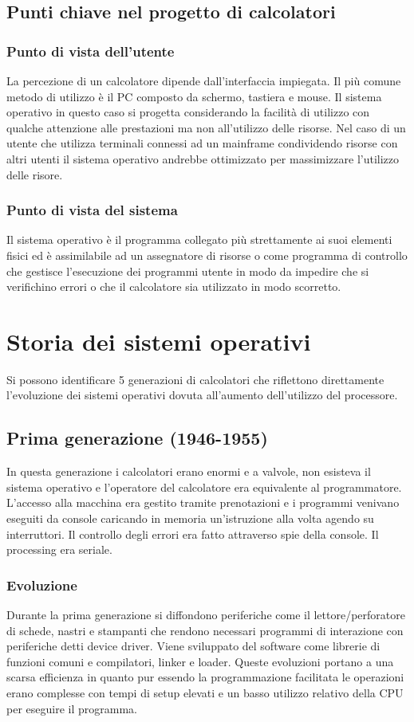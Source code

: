 \subsection{Punti chiave nel progetto di calcolatori}
\subsubsection{Punto di vista dell'utente}
La percezione di un calcolatore dipende dall'interfaccia impiegata. Il pi\`u comune metodo di utilizzo \`e il PC composto da schermo, tastiera e mouse. Il sistema operativo in questo caso si progetta considerando la facilit\`a di 
utilizzo con qualche attenzione alle prestazioni ma non all'utilizzo delle risorse. Nel caso di un utente che utilizza terminali connessi ad un mainframe condividendo risorse con altri utenti il sistema operativo andrebbe ottimizzato
per massimizzare l'utilizzo delle risore.
\subsubsection{Punto di vista del sistema}
Il sistema operativo \`e il programma collegato pi\`u strettamente ai suoi elementi fisici ed \`e assimilabile ad un assegnatore di risorse o come programma di controllo che gestisce l'esecuzione dei programmi utente in modo da 
impedire che si verifichino errori o che il calcolatore sia utilizzato in modo scorretto.
\section{Storia dei sistemi operativi}
Si possono identificare 5 generazioni di calcolatori che riflettono direttamente l'evoluzione dei sistemi operativi dovuta all'aumento dell'utilizzo del processore. 
\subsection{Prima generazione (1946-1955)}
In questa generazione i calcolatori erano enormi e a valvole, non esisteva il sistema operativo e l'operatore del calcolatore era equivalente al programmatore. L'accesso alla macchina era gestito tramite 
prenotazioni e i programmi venivano eseguiti da console caricando in memoria un'istruzione alla volta agendo su interruttori. Il controllo degli errori era fatto attraverso spie della console. Il processing era 
seriale.
\subsubsection{Evoluzione}
Durante la prima generazione si diffondono periferiche come il lettore/perforatore di schede, nastri e stampanti che rendono necessari programmi di interazione con periferiche detti device driver. Viene 
sviluppato del software come librerie di funzioni comuni e compilatori, linker e loader. Queste evoluzioni portano a una scarsa efficienza in quanto pur essendo la programmazione facilitata le operazioni erano 
complesse con tempi di setup elevati e un basso utilizzo relativo della CPU per eseguire il programma.
